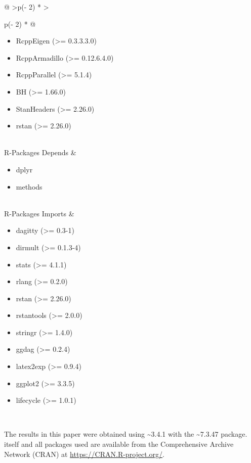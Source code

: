 \documentclass[
  11pt,
  article]{jss}
\providecommand{\tightlist}{%
  \setlength{\itemsep}{0pt}\setlength{\parskip}{0pt}}\usepackage{longtable,booktabs,array}
\begin{document}
\begin{longtable}[]{@{}
  >{\raggedleft\arraybackslash}p{(\columnwidth - 2\tabcolsep) * }
  >{\raggedright\arraybackslash}p{(\columnwidth - 2\tabcolsep) * }@{}}
\begin{minipage}[t]{\linewidth}
\begin{itemize}
  Rcpp (\textgreater= 0.12.0)
\item
  RcppEigen (\textgreater= 0.3.3.3.0)
\item
  RcppArmadillo (\textgreater= 0.12.6.4.0)
\item
  RcppParallel (\textgreater= 5.1.4)
\item
  BH (\textgreater= 1.66.0)
\item
  StanHeaders (\textgreater= 2.26.0)
\item
  rstan (\textgreater= 2.26.0)
\end{itemize}
\end{minipage} \\
R-Packages Depends & \begin{minipage}[t]{\linewidth}\raggedright
\begin{itemize}
\tightlist
\item
  dplyr
\item
  methods
\end{itemize}
\end{minipage} \\
R-Packages Imports & \begin{minipage}[t]{\linewidth}\raggedright
\begin{itemize}
\tightlist
\item
  dagitty (\textgreater= 0.3-1)
\item
  dirmult (\textgreater= 0.1.3-4)
\item
  stats (\textgreater= 4.1.1)
\item
  rlang (\textgreater= 0.2.0)
\item
  rstan (\textgreater= 2.26.0)
\item
  rstantools (\textgreater= 2.0.0)
\item
  stringr (\textgreater= 1.4.0)
\item
  ggdag (\textgreater= 0.2.4)
\item
  latex2exp (\textgreater= 0.9.4)
\item
  ggplot2 (\textgreater= 3.3.5)
\item
  lifecycle (\textgreater= 1.0.1)
\end{itemize}
\end{minipage} \\
\end{longtable}

The results in this paper were obtained using
\textasciitilde3.4.1 with the
\textasciitilde7.3.47 package.  itself and all
packages used are available from the Comprehensive  Archive
Network (CRAN) at \url{https://CRAN.R-project.org/}.
\end{document}
